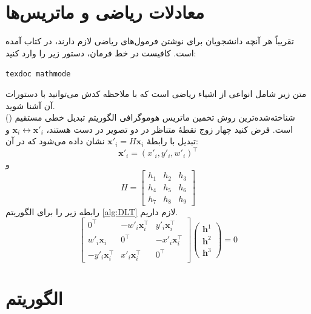 \section{معادلات ریاضی و ماتریس‌ها}
تقریباً هر آنچه دانشجویان برای نوشتن فرمول‌های ریاضی لازم دارند، در کتاب 
آمده است. کافیست در خط فرمان، دستور زیر را وارد کنید:
\begin{latin}
	\texttt{texdoc mathmode}
\end{latin}
متن زیر شامل انواعی از اشیاء ریاضی است که با ملاحظه کدش می‌توانید با دستورات آن آشنا شوید.\\
شناخته‌شده‌ترین روش تخمین ماتریس هوموگرافی الگوریتم تبدیل خطی مستقیم () است.  فرض کنید چهار زوج نقطهٔ متناظر در دو تصویر در دست هستند،  $\mathbf{x}_i\leftrightarrow\mathbf{x}'_i$   و تبدیل با رابطهٔ
  $\mathbf{x}'_i = H\mathbf{x}_i$
  نشان داده می‌شود که در آن:
\[\mathbf{x}'_i=(x'_i,y'_i,w'_i)^\top  \]
و
\[ H=\left[
\begin{array}{ccc}
h_1 & h_2 & h_3 \\ 
h_4 & h_5 & h_6 \\ 
h_7 & h_8 & h_9
\end{array} 
\right]\]
رابطه زیر را برای الگوریتم  \eqref{alg:DLT} لازم داریم.
\begin{equation}
\label{eq:DLT_Ah}
\left[
\begin{array}{ccc}
	0^\top & -w'_i\mathbf{x}_i^\top & y'_i\mathbf{x}_i^\top \\ 
	w'_i\mathbf{x}_i & 0^\top & -x'_i\mathbf{x}_i^\top \\ 
	- y'_i\mathbf{x}_i^\top & x'_i\mathbf{x}_i^\top & 0^\top
\end{array} 
\right]
\left(
\begin{array}{c}
	\mathbf{h}^1 \\ 
	\mathbf{h}^2 \\ 
	\mathbf{h}^3
\end{array} 
\right)=0
\end{equation}

\section{الگوریتم}

